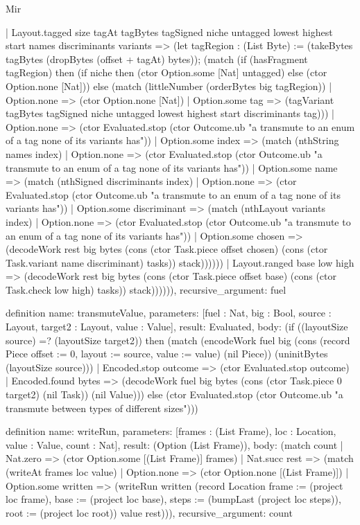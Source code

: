 \begin{lexlean}{Mir}
\begin{semanticmodule}
{          | Layout.tagged size tagAt tagBytes tagSigned niche untagged lowest highest start names discriminants variants => (let tagRegion : (List Byte) := (takeBytes tagBytes (dropBytes (offset + tagAt) bytes)); (match (if (hasFragment tagRegion) then (if niche then (ctor Option.some [Nat] untagged) else (ctor Option.none [Nat])) else (match (littleNumber (orderBytes big tagRegion))
            | Option.none => (ctor Option.none [Nat])
            | Option.some tag => (tagVariant tagBytes tagSigned niche untagged lowest highest start discriminants tag)))
            | Option.none => (ctor Evaluated.stop (ctor Outcome.ub "a transmute to an enum of a tag none of its variants has"))
            | Option.some index => (match (nthString names index)
              | Option.none => (ctor Evaluated.stop (ctor Outcome.ub "a transmute to an enum of a tag none of its variants has"))
              | Option.some name => (match (nthSigned discriminants index)
                | Option.none => (ctor Evaluated.stop (ctor Outcome.ub "a transmute to an enum of a tag none of its variants has"))
                | Option.some discriminant => (match (nthLayout variants index)
                  | Option.none => (ctor Evaluated.stop (ctor Outcome.ub "a transmute to an enum of a tag none of its variants has"))
                  | Option.some chosen => (decodeWork rest big bytes (cons (ctor Task.piece offset chosen) (cons (ctor Task.variant name discriminant) tasks)) stack))))))
          | Layout.ranged base low high => (decodeWork rest big bytes (cons (ctor Task.piece offset base) (cons (ctor Task.check low high) tasks)) stack)))))),
  recursive_argument: fuel
}

definition{
  name: transmuteValue,
  parameters: [fuel : Nat, big : Bool, source : Layout, target2 : Layout, value : Value],
  result: Evaluated,
  body: (if ((layoutSize source) =? (layoutSize target2)) then (match (encodeWork fuel big (cons (record Piece {offset := 0, layout := source, value := value}) (nil Piece)) (uninitBytes (layoutSize source)))
    | Encoded.stop outcome => (ctor Evaluated.stop outcome)
    | Encoded.found bytes => (decodeWork fuel big bytes (cons (ctor Task.piece 0 target2) (nil Task)) (nil Value))) else (ctor Evaluated.stop (ctor Outcome.ub "a transmute between types of different sizes")))
}

definition{
  name: writeRun,
  parameters: [frames : (List Frame), loc : Location, value : Value, count : Nat],
  result: (Option (List Frame)),
  body: (match count
    | Nat.zero => (ctor Option.some [(List Frame)] frames)
    | Nat.succ rest => (match (writeAt frames loc value)
      | Option.none => (ctor Option.none [(List Frame)])
      | Option.some written => (writeRun written (record Location {frame := (project loc frame), base := (project loc base), steps := (bumpLast (project loc steps)), root := (project loc root)}) value rest))),
  recursive_argument: count
}


\end{semanticmodule}
\end{lexlean}
